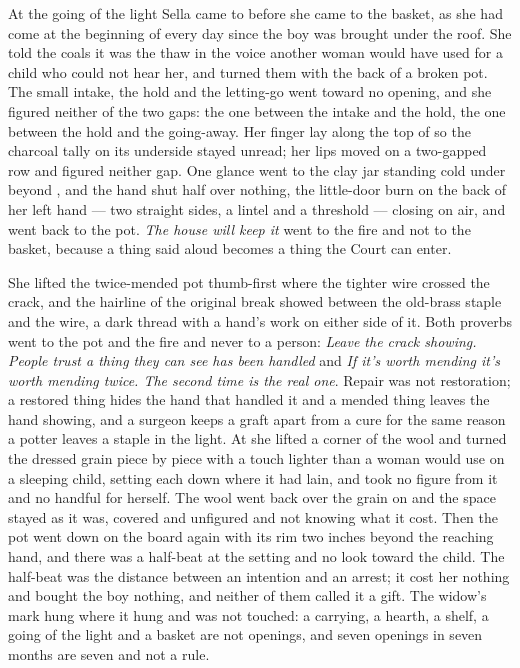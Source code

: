 At the going of the light Sella came to  before she came to the basket, as she had come at the beginning of every day since the boy was brought under the roof. She told the coals it was the thaw in the voice another woman would have used for a child who could not hear her, and turned them with the back of a broken pot. The small intake, the hold and the letting-go went toward no opening, and she figured neither of the two gaps: the one between the intake and the hold, the one between the hold and the going-away. Her finger lay along the top of  so the charcoal tally on its underside stayed unread; her lips moved on a two-gapped row and figured neither gap. One glance went to the clay jar standing cold under  beyond , and the hand shut half over nothing, the little-door burn on the back of her left hand --- two straight sides, a lintel and a threshold --- closing on air, and went back to the pot. \emph{The house will keep it} went to the fire and not to the basket, because a thing said aloud becomes a thing the Court can enter.

She lifted the twice-mended pot thumb-first where the tighter wire crossed the crack, and the hairline of the original break showed between the old-brass staple and the wire, a dark thread with a hand's work on either side of it. Both proverbs went to the pot and the fire and never to a person: \emph{Leave the crack showing. People trust a thing they can see has been handled} and \emph{If it's worth mending it's worth mending twice. The second time is the real one}. Repair was not restoration; a restored thing hides the hand that handled it and a mended thing leaves the hand showing, and a surgeon keeps a graft apart from a cure for the same reason a potter leaves a staple in the light. At  she lifted a corner of the wool and turned the dressed grain piece by piece with a touch lighter than a woman would use on a sleeping child, setting each down where it had lain, and took no figure from it and no handful for herself. The wool went back over the grain on  and the space stayed as it was, covered and unfigured and not knowing what it cost. Then the pot went down on the board again with its rim two inches beyond the reaching hand, and there was a half-beat at the setting and no look toward the child. The half-beat was the distance between an intention and an arrest; it cost her nothing and bought the boy nothing, and neither of them called it a gift. The widow's mark hung where it hung and was not touched: a carrying, a hearth, a shelf, a going of the light and a basket are not openings, and seven openings in seven months are seven and not a rule.

